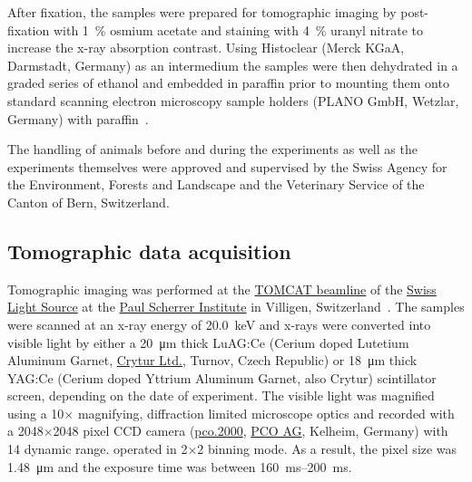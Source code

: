 \documentclass[a4paper,DIVcalc,abstract,english]{scrartcl}
\begin{document}
After fixation, the samples were prepared for tomographic imaging by post-fixation with \SI{1}{\percent} osmium acetate and staining with \SI{4}{\percent} uranyl nitrate to increase the x-ray absorption contrast.
Using Histoclear (Merck KGaA, Darmstadt, Germany) as an intermedium the samples were then dehydrated in a graded series of ethanol and embedded in paraffin prior to mounting them onto standard scanning electron microscopy sample holders (PLANO GmbH, Wetzlar, Germany) with paraffin~\cite{Tsuda2008}.

The handling of animals before and during the experiments as well as the experiments themselves were approved and supervised by the Swiss Agency for the Environment, Forests and Landscape and the Veterinary Service of the Canton of Bern, Switzerland.

\subsection{Tomographic data acquisition}
Tomographic imaging was performed at the \href{http://www.psi.ch/sls/tomcat/}{TOMCAT beamline} of the \href{http://www.psi.ch/sls/}{Swiss Light Source} at the \href{http://www.psi.ch/}{Paul Scherrer Institute} in Villigen, Switzerland~\cite{Stampanoni2006a}.
The samples were scanned at an x-ray energy of \SI{20.0}{\kilo\electronvolt} and x-rays were converted into visible light by either a \SI{20}{\micro\meter} thick LuAG:Ce (Cerium doped Lutetium Aluminum Garnet, \href{http://www.crytur.cz/}{Crytur Ltd.}, Turnov, Czech Republic) or \SI{18}{\micro\meter} thick YAG:Ce (Cerium doped Yttrium Aluminum Garnet, also Crytur) scintillator screen, depending on the date of experiment.
The visible light was magnified using a 10\(\times\) magnifying, diffraction limited microscope optics and recorded with a 2048\(\times\)2048 pixel CCD camera (\href{http://www.pco.de/sensitive-cameras/pco2000/}{pco.2000}, \href{http://www.pco.de/}{PCO AG}, Kelheim, Germany) with \SI{14}{\bit} dynamic range. operated in 2\(\times\)2 binning mode.
As a result, the pixel size was \SI{1.48}{\micro\meter} and the exposure time was between \SIrange{160}{200}{\milli\second}.
\end{document}

